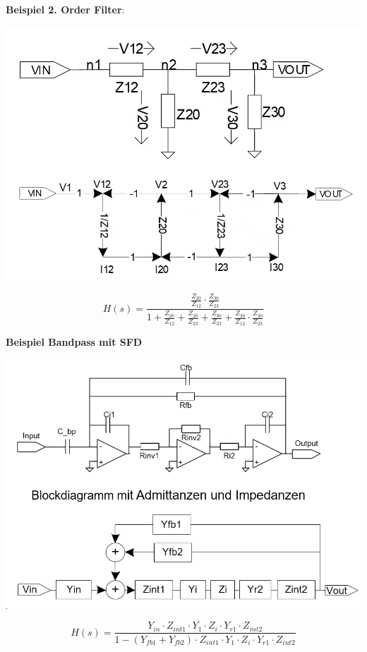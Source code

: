 \noindent\textbf{Beispiel 2. Order Filter}:
\begin{center}
	\includegraphics[width=\columnwidth]{Images/sfd}
\end{center}
\[
H(s) = \frac{\frac{Z_{20}}{Z_{12}}\cdot \frac{Z_{30}}{Z_{23}}}{1 + \frac{Z_{20}}{Z_{12}} + \frac{Z_{20}}{Z_{23}} + \frac{Z_{30}}{Z_{23}} + \frac{Z_{20}}{Z_{12}}\cdot\frac{Z_{30}}{Z_{23}} }
\]

\noindent\textbf{Beispiel Bandpass mit SFD}
\begin{center}
	\includegraphics[width=\columnwidth]{Images/bandpass_sfd}
\end{center}
\[
H(s) = \frac{Y_{in}\cdot Z_{int1} \cdot Y_{1} \cdot Z_i \cdot Y_{r1}\cdot Z_{int2}}{1 - (Y_{fb1} + Y_{fb2})\cdot Z_{int1}\cdot Y_{1} \cdot Z_i \cdot Y_{r1}\cdot Z_{int2}}
\]

